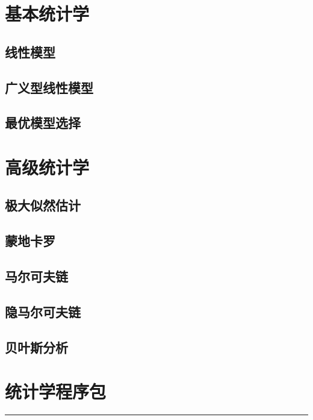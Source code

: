 \documentclass[]{book}
\begin{document}
\section{基本统计学}

\subsection{线性模型}

\subsection{广义型线性模型}

\subsection{最优模型选择}

\section{高级统计学}

\subsection{极大似然估计}

\subsection{蒙地卡罗}

\subsection{马尔可夫链}

\subsection{隐马尔可夫链}

\subsection{贝叶斯分析}

\section{统计学程序包}

\begin{center}\rule{0.5\linewidth}{\linethickness}\end{center}
\end{document}
